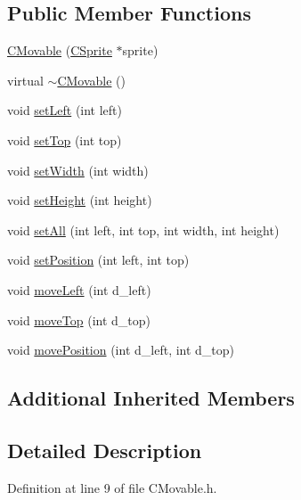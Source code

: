 \subsection*{Public Member Functions}
\begin{DoxyCompactItemize}
\item 
\hyperlink{classengine_1_1CMovable_af28d9429a4bf12fc37fb807bb0ae9c05}{C\-Movable} (\hyperlink{classCSprite}{C\-Sprite} $\ast$sprite)
\item 
virtual \hyperlink{classengine_1_1CMovable_a2a8adce4d82128afdde96d0c9eb724b7}{$\sim$\-C\-Movable} ()
\item 
void \hyperlink{classengine_1_1CMovable_aa4b25f57e8b5613035463f28eaa4fc36}{set\-Left} (int left)
\item 
void \hyperlink{classengine_1_1CMovable_a680ee306f10a10a79616e3483300edb0}{set\-Top} (int top)
\item 
void \hyperlink{classengine_1_1CMovable_af8a646f2cebafb3f1cec4934132e3128}{set\-Width} (int width)
\item 
void \hyperlink{classengine_1_1CMovable_a6e78d43b1968931da9c91e4657502025}{set\-Height} (int height)
\item 
void \hyperlink{classengine_1_1CMovable_a98ef52dedd948dc2cc6fd5cad92444c0}{set\-All} (int left, int top, int width, int height)
\item 
void \hyperlink{classengine_1_1CMovable_ad6342adfc04b24120e5b19cf77fe44f5}{set\-Position} (int left, int top)
\item 
void \hyperlink{classengine_1_1CMovable_aba30b69bd14b16076f3d11c7b0471b83}{move\-Left} (int d\-\_\-left)
\item 
void \hyperlink{classengine_1_1CMovable_ad8f9971aa2d8c6a056d9ca04a2aba195}{move\-Top} (int d\-\_\-top)
\item 
void \hyperlink{classengine_1_1CMovable_a680b7faa861881cca82952f01d0fb20e}{move\-Position} (int d\-\_\-left, int d\-\_\-top)
\end{DoxyCompactItemize}
\subsection*{Additional Inherited Members}


\subsection{Detailed Description}


Definition at line 9 of file C\-Movable.\-h.



